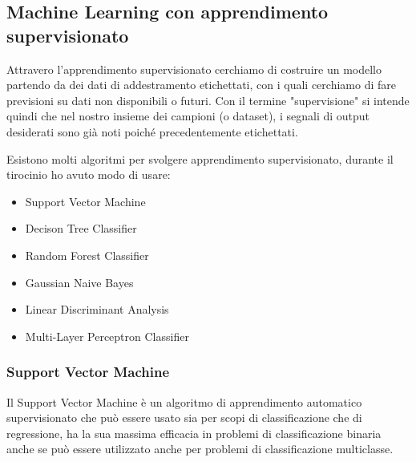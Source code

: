 \documentclass[12pt,italian]{report}
\begin{document}
\subsection{Machine Learning con apprendimento supervisionato}
\label{sec:apprendimento supervisionato}
Attravero l’apprendimento supervisionato cerchiamo di costruire un modello partendo da dei dati di addestramento etichettati, con i quali cerchiamo di fare previsioni su dati non disponibili o futuri. Con il termine "supervisione" si intende quindi che nel nostro insieme dei campioni (o dataset), i segnali di output desiderati sono già noti poiché precedentemente etichettati.

Esistono molti algoritmi per svolgere apprendimento supervisionato, durante il tirocinio ho avuto modo di usare:
\begin{itemize}
	\item Support Vector Machine
	\item Decison Tree Classifier
	\item Random Forest Classifier
	\item Gaussian Naive Bayes
	\item Linear Discriminant Analysis
	\item Multi-Layer Perceptron Classifier
\end{itemize}

\subsubsection{Support Vector Machine}
\label{sec:SVC}
Il Support Vector Machine è un algoritmo di apprendimento automatico supervisionato che può essere usato sia per scopi di classificazione che di regressione, ha la sua massima efficacia in problemi di classificazione binaria anche se può essere utilizzato anche per problemi di classificazione multiclasse.
\end{document}
